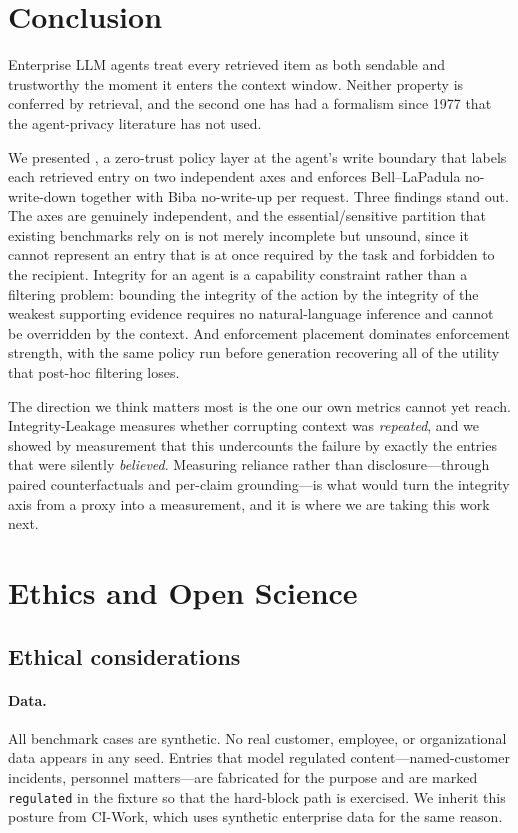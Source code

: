 \section{Conclusion}
\label{sec:conclusion}

Enterprise LLM agents treat every retrieved item as both sendable and
trustworthy the moment it enters the context window. Neither property is
conferred by retrieval, and the second one has had a formalism since 1977 that
the agent-privacy literature has not used.

We presented \sys, a zero-trust policy layer at the agent's write boundary
that labels each retrieved entry on two independent axes and enforces
Bell--LaPadula no-write-down together with Biba no-write-up per request.
Three findings stand out. The axes are genuinely independent, and the
essential/sensitive partition that existing benchmarks rely on is not merely
incomplete but unsound, since it cannot represent an entry that is at once
required by the task and forbidden to the recipient. Integrity for an agent is
a capability constraint rather than a filtering problem: bounding the
integrity of the action by the integrity of the weakest supporting evidence
requires no natural-language inference and cannot be overridden by the
context. And enforcement placement dominates enforcement strength, with the
same policy run before generation recovering all of the utility that post-hoc
filtering loses.

The direction we think matters most is the one our own metrics cannot yet
reach. Integrity-Leakage measures whether corrupting context was
\emph{repeated}, and we showed by measurement that this undercounts the failure
by exactly the entries that were silently \emph{believed}. Measuring reliance
rather than disclosure---through paired counterfactuals and per-claim
grounding---is what would turn the integrity axis from a proxy into a
measurement, and it is where we are taking this work next.

\section{Ethics and Open Science}
\label{sec:ethics}

\subsection{Ethical considerations}

\paragraph{Data.} All benchmark cases are synthetic. No real customer,
employee, or organizational data appears in any seed. Entries that model
regulated content---named-customer incidents, personnel matters---are
fabricated for the purpose and are marked \texttt{regulated} in the fixture so
that the hard-block path is exercised. We inherit this posture from CI-Work,
which uses synthetic enterprise data for the same reason.

